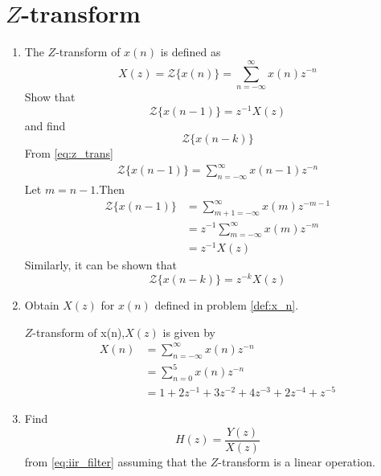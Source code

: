 \documentclass[journal,12pt,twocolumn]{IEEEtran}
\renewcommand\thesection{\arabic{section}}
\begin{document}
\section{$Z$-transform}
\begin{enumerate}[label=\thesection.\arabic*]
\item The $Z$-transform of $x(n)$ is defined as
%
\begin{equation}
\label{eq:z_trans}
X(z)={\mathcal {Z}}\{x(n)\}=\sum _{n=-\infty }^{\infty }x(n)z^{-n}
\end{equation}
%
Show that
\begin{equation}
\label{eq:shift1}
{\mathcal {Z}}\{x(n-1)\} = z^{-1}X(z)
\end{equation}
and find
\begin{equation}
	{\mathcal {Z}}\{x(n-k)\} 
\end{equation}
\solution From \eqref{eq:z_trans}
\begin{align}
	{\mathcal {Z}}\{x(n-1)\}=\sum_{n=-\infty}^\infty x(n-1)z^{-n}
\end{align}
Let $m=n-1$.Then
\begin{align}
	{\mathcal {Z}}\{x(n-1)\}&=\sum_{m+1=-\infty}^\infty x(m)z^{-m-1}\\
	&=z^{-1}\sum_{m=-\infty}^\infty x(m)z^{-m}\\
	&=z^{-1}X(z)
\end{align}
Similarly, it can be shown that
%
\begin{equation}
\label{eq:z_trans_shift}
	{\mathcal {Z}}\{x(n-k)\} = z^{-k}X(z)
\end{equation}


\item Obtain $X(z)$ for $x(n)$ defined in problem 
\ref{def:x_n}.

\solution $Z$-transform of x(n),$X(z)$ is given by
\begin{align}
	X(n)&=\sum_{n=-\infty}^\infty x(n)z^{-n}\\
	&=\sum_{n=0}^5x(n)z^{-n}\\
	&=1+2z^{-1}+3z^{-2}+4z^{-3}+2z^{-4}+z^{-5}
\end{align}
\item Find
%
\begin{equation}
H(z) = \frac{Y(z)}{X(z)}
\end{equation}
%
from  \eqref{eq:iir_filter} assuming that the $Z$-transform is a linear operation.


\end{enumerate}
\end{document}
